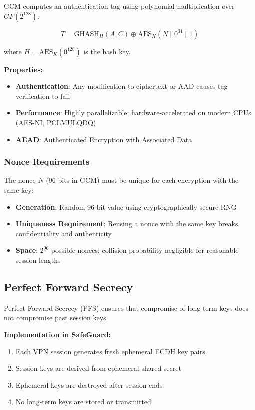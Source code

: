 \documentclass[12pt,a4paper]{article}
\begin{document}
GCM computes an authentication tag using polynomial multiplication over $GF(2^{128})$:

\begin{equation}
T = \text{GHASH}_H(A, C) \oplus \text{AES}_K(N \,||\, 0^{31} \,||\, 1)
\end{equation}

where $H = \text{AES}_K(0^{128})$ is the hash key.

\textbf{Properties:}
\begin{itemize}
    \item \textbf{Authentication}: Any modification to ciphertext or AAD causes tag verification to fail
    \item \textbf{Performance}: Highly parallelizable; hardware-accelerated on modern CPUs (AES-NI, PCLMULQDQ)
    \item \textbf{AEAD}: Authenticated Encryption with Associated Data
\end{itemize}

\subsubsection{Nonce Requirements}

The nonce $N$ (96 bits in GCM) must be unique for each encryption with the same key:

\begin{itemize}
    \item \textbf{Generation}: Random 96-bit value using cryptographically secure RNG
    \item \textbf{Uniqueness Requirement}: Reusing a nonce with the same key breaks confidentiality and authenticity
    \item \textbf{Space}: $2^{96}$ possible nonces; collision probability negligible for reasonable session lengths
\end{itemize}

\subsection{Perfect Forward Secrecy}

Perfect Forward Secrecy (PFS) ensures that compromise of long-term keys does not compromise past session keys.

\textbf{Implementation in SafeGuard:}

\begin{enumerate}
    \item Each VPN session generates fresh ephemeral ECDH key pairs
    \item Session keys are derived from ephemeral shared secret
    \item Ephemeral keys are destroyed after session ends
    \item No long-term keys are stored or transmitted
\end{enumerate}
\end{document}
